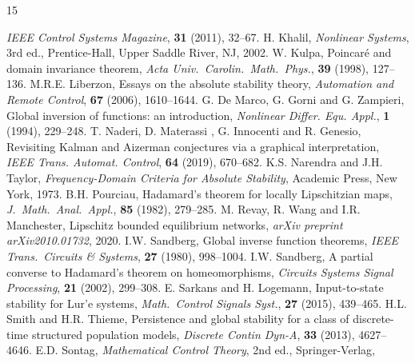 \documentclass[a4paper,11pt]{article}
\numberwithin{equation}{section}
\numberwithin{figure}{section}
\numberwithin{table}{section}
\begin{document}
\begin{thebibliography}{15}
\begin{small}
{\it IEEE Control Systems Magazine}, {\bf 31} (2011), 32--67.
%
\vspace{-2mm}
 H. Khalil, {\it Nonlinear Systems}, 3rd ed., Prentice-Hall, Upper Saddle River, NJ, 2002.
%
\vspace{-2mm}
 W. Kulpa, Poincar{\'e} and domain invariance theorem,
{\it Acta Univ.\ Carolin.\ Math.\ Phys.}, {\bf 39} (1998), 127--136.
%
\vspace{-6mm}
M.R.E. Liberzon, Essays on the absolute stability theory, {\it Automation and Remote Control}, {\bf 67} (2006), 1610--1644.
%
\vspace{-2mm}
 G. De Marco, G. Gorni and G. Zampieri, Global inversion of functions:
an introduction, {\it Nonlinear Differ. Equ. Appl.}, {\bf 1} (1994), 229--248.
%
\vspace{-2mm}
 T. Naderi, D. Materassi , G. Innocenti and R. Genesio, Revisiting Kalman and Aizerman conjectures via a graphical interpretation, {\it IEEE Trans. Automat. Control}, {\bf 64} (2019), 670--682.
%
\vspace{-2mm}
K.S. Narendra and J.H. Taylor, {\it Frequency-Domain Criteria for Absolute Stability}, Academic Press, New York, 1973.
%
\vspace{-2mm}
 B.H. Pourciau, Hadamard's theorem for locally Lipschitzian maps,
{\it J.\ Math.\ Anal.\ Appl.}, {\bf 85} (1982), 279--285.
%
\vspace{-2mm}
M. Revay, R. Wang and I.R. Manchester, Lipschitz bounded equilibrium
  networks, {\it arXiv preprint arXiv2010.01732}, 2020.
%
\vspace{-2mm}
 I.W. Sandberg, Global inverse function theorems, {\it IEEE Trans.\ Circuits
\& Systems}, {\bf 27} (1980), 998--1004.
%
\vspace{-2mm}
 I.W. Sandberg, A partial converse to Hadamard's theorem on homeomorphisms,
{\it Circuits Systems Signal Processing}, {\bf 21} (2002), 299--308.
%
\vspace{-2mm}
 E. Sarkans and H. Logemann, Input-to-state stability
for Lur'e systems, {\it Math.\ Control Signals Syst.}, {\bf 27} (2015), 439--465.
%
\vspace{-2mm}
H.L. Smith and H.R. Thieme, Persistence and global stability for a class of discrete-time structured population models, {\it Discrete Contin Dyn-A}, {\bf 33} (2013), 4627--4646.
%
\vspace{-2mm}
 E.D. Sontag, {\it Mathematical Control Theory}, 2nd ed., Springer-Verlag,

\end{small}
\end{thebibliography}
\end{document}
